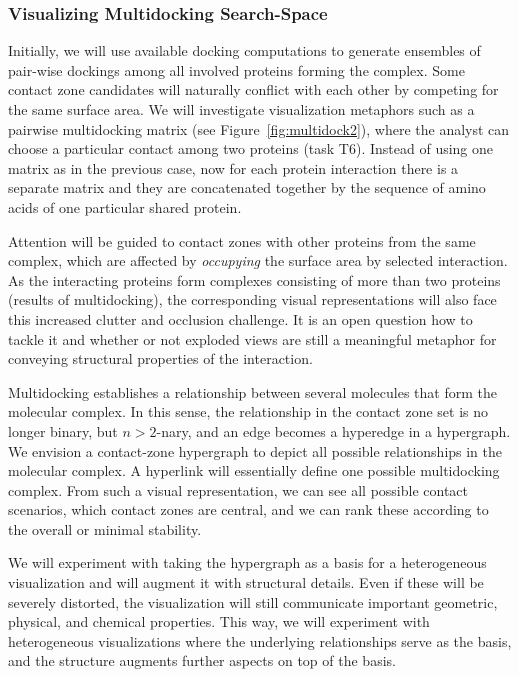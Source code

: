 \documentclass[11pt,a4paper,titlepage,oneside,onecolumn]{article}
\begin{document}
\subsubsection{Visualizing Multidocking Search-Space}
\vspace{-4mm}
Initially, we will use available docking computations to generate ensembles of pair-wise dockings among all involved proteins forming the complex. 
Some contact zone candidates will naturally conflict with each other by competing for the same surface area. 
We will investigate visualization metaphors such as a pairwise multidocking matrix (see Figure~\ref{fig:multidock2}), where the analyst can choose a particular contact among two proteins (task T6). 
Instead of using one matrix as in the previous case, now for each protein interaction there is a separate matrix and they are concatenated together by the sequence of amino acids of one particular shared protein. 

Attention will be guided to contact zones with other proteins from the same complex, which are affected by \emph{occupying} the surface area by selected interaction. As the interacting proteins form complexes consisting of more than two proteins (results of multidocking), the corresponding visual representations will also face this increased clutter and occlusion challenge. It is an open question how to tackle it and whether or not exploded views are still a meaningful metaphor for conveying structural properties of the interaction.

Multidocking establishes a relationship between several molecules that form the molecular complex. In this sense, the relationship in the contact zone set is no longer binary, but $n>2$-nary, and an edge becomes a hyperedge in a hypergraph. 
We envision a contact-zone hypergraph to depict all possible relationships in the molecular complex. 
A hyperlink will essentially define one possible multidocking complex. 
From such a visual representation, we can see all possible contact scenarios, which contact zones are central, and we can rank these according to the overall or minimal stability.

We will experiment with taking the hypergraph as a basis for a heterogeneous visualization and will augment it with structural details.
Even if these will be severely distorted, the visualization will still communicate important geometric, physical, and chemical properties. 
This way, we will experiment with heterogeneous visualizations where the underlying relationships serve as the basis, and the structure augments further aspects on top of the basis.
\end{document}
